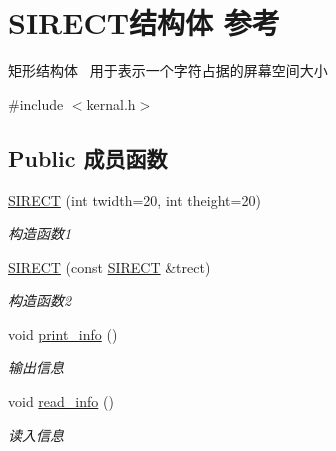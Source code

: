 \hypertarget{struct_s_i_r_e_c_t}{}\section{S\+I\+R\+E\+C\+T结构体 参考}
\label{struct_s_i_r_e_c_t}


矩形结构体~\newline
用于表示一个字符占据的屏幕空间大小  




{\ttfamily \#include $<$kernal.\+h$>$}

\subsection*{Public 成员函数}
\begin{DoxyCompactItemize}
\item 
\mbox{\label{struct_s_i_r_e_c_t_a845bf8054bfcbdf5336798f61d220d05}} 
\hyperlink{struct_s_i_r_e_c_t_a845bf8054bfcbdf5336798f61d220d05}{S\+I\+R\+E\+CT} (int twidth=20, int theight=20)
\begin{DoxyCompactList}\small\item\em 构造函数1~\newline
\end{DoxyCompactList}\item 
\mbox{\label{struct_s_i_r_e_c_t_ac26d21eb684ef839d9ed8312529da7b6}} 
\hyperlink{struct_s_i_r_e_c_t_ac26d21eb684ef839d9ed8312529da7b6}{S\+I\+R\+E\+CT} (const \hyperlink{struct_s_i_r_e_c_t}{S\+I\+R\+E\+CT} \&trect)
\begin{DoxyCompactList}\small\item\em 构造函数2 \end{DoxyCompactList}\item 
\mbox{\label{struct_s_i_r_e_c_t_a957572a08504c62c09a2aee9c5daef13}} 
void \hyperlink{struct_s_i_r_e_c_t_a957572a08504c62c09a2aee9c5daef13}{print\+\_\+info} ()
\begin{DoxyCompactList}\small\item\em 输出信息 \end{DoxyCompactList}\item 
\mbox{\label{struct_s_i_r_e_c_t_adac76b03ea3b2441cc0ea8af05b7815a}} 
void \hyperlink{struct_s_i_r_e_c_t_adac76b03ea3b2441cc0ea8af05b7815a}{read\+\_\+info} ()
\begin{DoxyCompactList}\small\item\em 读入信息 \end{DoxyCompactList}\end{DoxyCompactItemize}

